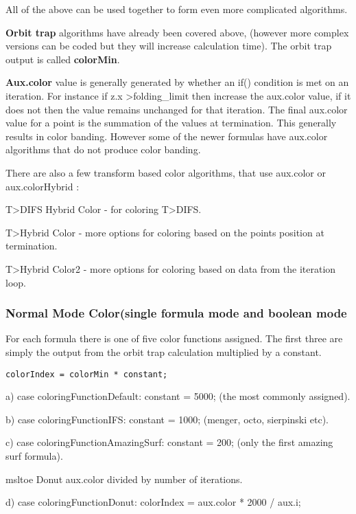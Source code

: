 All of the above can be used together to form even more complicated algorithms.

\textbf{Orbit trap} algorithms have already been covered above, (however more complex versions can be coded but they will increase calculation time). The orbit trap output is called \textbf{colorMin}.

\textbf{Aux.color} value is generally generated by whether an if() condition is met on an iteration. For instance if z.x \textgreater\space folding\_limit then increase the aux.color value, if it does not then the value remains unchanged for that iteration. The final aux.color value for a point is the summation of the values at termination. This generally results in color banding. However some of the newer formulas have aux.color algorithms that do not produce color banding.

There are also a few transform based color algorithms, that use aux.color or aux.colorHybrid :

T>DIFS Hybrid Color - for coloring T>DIFS.

T>Hybrid Color - more options for coloring based on the points position at termination.

T>Hybrid Color2 - more options for coloring based on data from the iteration loop.

\subsubsection{Normal Mode Color(single formula mode and boolean mode}\label{materials-normal-mode-color}

For each formula there is one of five color functions assigned. The first three are simply the output from the orbit trap calculation multiplied by a constant.

\begin{lstlisting}
colorIndex = colorMin * constant;
\end{lstlisting}
	

a) case coloringFunctionDefault: constant = 5000; (the most commonly assigned).

b) case coloringFunctionIFS: constant = 1000; (menger, octo, sierpinski etc).

c) case coloringFunctionAmazingSurf: constant = 200; (only the first amazing surf formula).

msltoe Donut aux.color divided by number of iterations.

d) case coloringFunctionDonut: colorIndex = aux.color * 2000 / aux.i;

